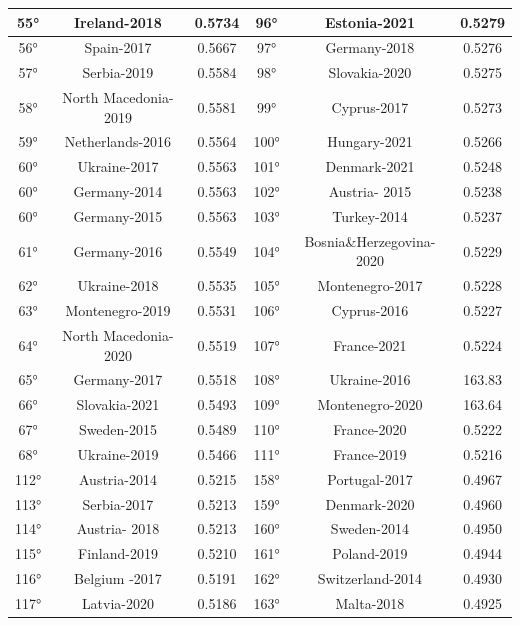 \documentclass[a4paper,12pt, openright]{report}
\begin{document}
\begin{longtable}[c]{|c|c|c|c|c|c|}
    \hline
    55° &  Ireland-2018 & 0.5734 & 96° &  Estonia-2021 & 0.5279 \\
    \hline
    56° &  Spain-2017 & 0.5667 & 97° &  Germany-2018 & 0.5276 \\
    \hline
    57° &  Serbia-2019 & 0.5584 & 98°	& Slovakia-2020 & 0.5275 \\
    \hline
    58° &  North Macedonia-2019 & 0.5581 & 99° &  Cyprus-2017 & 0.5273 \\
    \hline
    59° &  Netherlands-2016 & 0.5564 & 100° &  Hungary-2021 & 0.5266 \\
    \hline
    60° &  Ukraine-2017  & 0.5563 & 101° &  Denmark-2021 & 0.5248\\
    \hline
    60° &  Germany-2014 & 0.5563 & 102° &  Austria- 2015 & 0.5238 \\
    \hline
    60° &  Germany-2015 & 0.5563 & 103° &  Turkey-2014 & 0.5237 \\
    \hline
    61° &  Germany-2016 & 0.5549 & 104° &  Bosnia\&Herzegovina-2020 & 0.5229 \\
    \hline
    62° &  Ukraine-2018 & 0.5535 & 105° &  Montenegro-2017 & 0.5228 \\
    \hline
    63° & Montenegro-2019 & 0.5531 & 106° &  Cyprus-2016 & 0.5227 \\
    \hline
    64° &  North Macedonia-2020 & 0.5519  & 107° &  France-2021 & 0.5224 \\
    \hline
    65° &  Germany-2017 & 0.5518 & 108° &  Ukraine-2016 & 163.83 \\
    \hline
    66° &  Slovakia-2021 & 0.5493  & 109° &  Montenegro-2020 & 163.64\\
    \hline
    67° &  Sweden-2015 & 0.5489 & 110° &  France-2020 & 0.5222 \\
    \hline
    68° &  Ukraine-2019  & 0.5466 & 111° &  France-2019 & 0.5216 \\
    \hline
    112° &  Austria-2014 & 0.5215 & 158° &  Portugal-2017 & 0.4967 \\
    \hline
    113° &  Serbia-2017 & 0.5213 & 159° &  Denmark-2020 & 0.4960 \\
    \hline
    114° &  Austria- 2018 & 0.5213 & 160° &  Sweden-2014 & 0.4950 \\
    \hline
    115° &  Finland-2019 & 0.5210 & 161° &  Poland-2019 & 0.4944 \\
    \hline
    116° &  Belgium -2017 & 0.5191 & 162° &  Switzerland-2014 & 0.4930 \\
    \hline
    117° &  Latvia-2020 & 0.5186 & 163° &  Malta-2018 & 0.4925 \\

\end{longtable}
\end{document}
